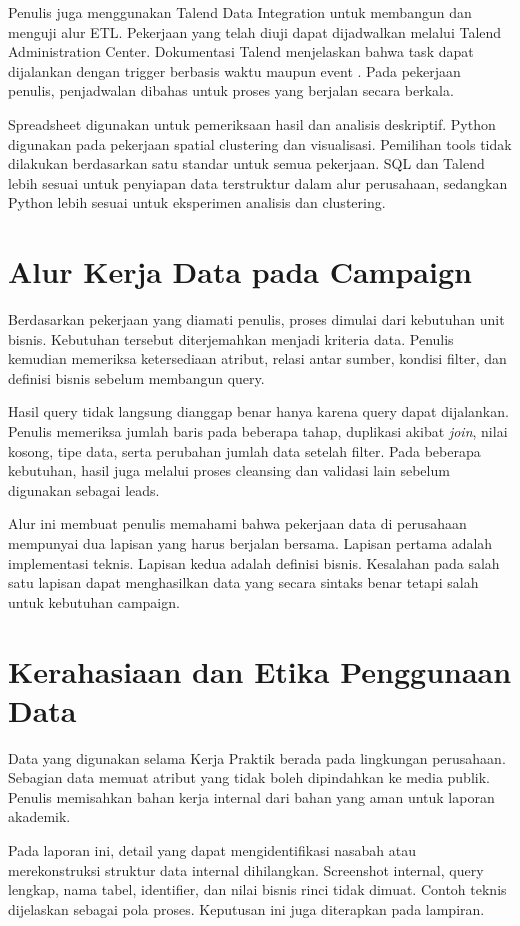 Penulis juga menggunakan Talend Data Integration untuk membangun dan menguji alur ETL. Pekerjaan yang telah diuji dapat dijadwalkan melalui Talend Administration Center. Dokumentasi Talend menjelaskan bahwa task dapat dijalankan dengan trigger berbasis waktu maupun event \autocite{talend2026}. Pada pekerjaan penulis, penjadwalan dibahas untuk proses yang berjalan secara berkala.

Spreadsheet digunakan untuk pemeriksaan hasil dan analisis deskriptif. Python digunakan pada pekerjaan spatial clustering dan visualisasi. Pemilihan tools tidak dilakukan berdasarkan satu standar untuk semua pekerjaan. SQL dan Talend lebih sesuai untuk penyiapan data terstruktur dalam alur perusahaan, sedangkan Python lebih sesuai untuk eksperimen analisis dan clustering.

\section{Alur Kerja Data pada Campaign}
Berdasarkan pekerjaan yang diamati penulis, proses dimulai dari kebutuhan unit bisnis. Kebutuhan tersebut diterjemahkan menjadi kriteria data. Penulis kemudian memeriksa ketersediaan atribut, relasi antar sumber, kondisi filter, dan definisi bisnis sebelum membangun query.

Hasil query tidak langsung dianggap benar hanya karena query dapat dijalankan. Penulis memeriksa jumlah baris pada beberapa tahap, duplikasi akibat \textit{join}, nilai kosong, tipe data, serta perubahan jumlah data setelah filter. Pada beberapa kebutuhan, hasil juga melalui proses cleansing dan validasi lain sebelum digunakan sebagai leads.

Alur ini membuat penulis memahami bahwa pekerjaan data di perusahaan mempunyai dua lapisan yang harus berjalan bersama. Lapisan pertama adalah implementasi teknis. Lapisan kedua adalah definisi bisnis. Kesalahan pada salah satu lapisan dapat menghasilkan data yang secara sintaks benar tetapi salah untuk kebutuhan campaign.

\section{Kerahasiaan dan Etika Penggunaan Data}
Data yang digunakan selama Kerja Praktik berada pada lingkungan perusahaan. Sebagian data memuat atribut yang tidak boleh dipindahkan ke media publik. Penulis memisahkan bahan kerja internal dari bahan yang aman untuk laporan akademik.

Pada laporan ini, detail yang dapat mengidentifikasi nasabah atau merekonstruksi struktur data internal dihilangkan. Screenshot internal, query lengkap, nama tabel, identifier, dan nilai bisnis rinci tidak dimuat. Contoh teknis dijelaskan sebagai pola proses. Keputusan ini juga diterapkan pada lampiran.
